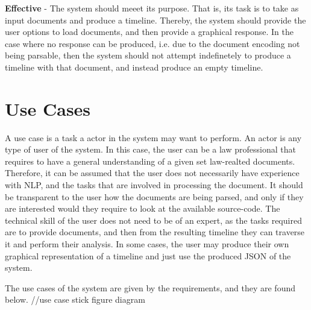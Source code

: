 \par \textbf{Effective} - The system should meeet its purpose. That is, its task is to take as input documents and produce a timeline. Thereby, the system should provide the user options to load documents, and then provide a graphical response. In the case where no response can be produced, i.e. due to the document encoding not being parsable, then the system should not attempt indefinetely to produce a timeline with that document, and instead produce an empty timeline. 
\section{Use Cases}
\par A use case is a task a actor in the system may want to perform. An actor is any type of user of the system. In this case, the user can be a law professional that requires to have a general understanding of a given set law-realted documents. Therefore, it can be assumed that the user does not necessarily have experience with NLP, and the tasks that are involved in processing the document. It should be transparent to the user how the documents are being parsed, and only if they are interested would they require to look at the available source-code. The technical skill of the user does not need to be of an expert, as the tasks required are to provide documents, and then from the resulting timeline they can traverse it and perform their analysis. In some cases, the user may produce their own graphical representation of a timeline and just use the produced JSON of the system.
\par The use cases of the system are given by the requirements, and they are found below. //use case stick figure diagram
